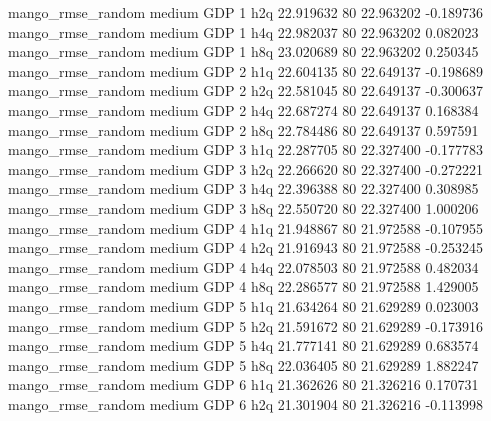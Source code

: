 mango_rmse_random     medium      GDP                 1                  h2q 22.919632 80      22.963202          -0.189736
mango_rmse_random     medium      GDP                 1                  h4q 22.982037 80      22.963202           0.082023
mango_rmse_random     medium      GDP                 1                  h8q 23.020689 80      22.963202           0.250345
mango_rmse_random     medium      GDP                 2                  h1q 22.604135 80      22.649137          -0.198689
mango_rmse_random     medium      GDP                 2                  h2q 22.581045 80      22.649137          -0.300637
mango_rmse_random     medium      GDP                 2                  h4q 22.687274 80      22.649137           0.168384
mango_rmse_random     medium      GDP                 2                  h8q 22.784486 80      22.649137           0.597591
mango_rmse_random     medium      GDP                 3                  h1q 22.287705 80      22.327400          -0.177783
mango_rmse_random     medium      GDP                 3                  h2q 22.266620 80      22.327400          -0.272221
mango_rmse_random     medium      GDP                 3                  h4q 22.396388 80      22.327400           0.308985
mango_rmse_random     medium      GDP                 3                  h8q 22.550720 80      22.327400           1.000206
mango_rmse_random     medium      GDP                 4                  h1q 21.948867 80      21.972588          -0.107955
mango_rmse_random     medium      GDP                 4                  h2q 21.916943 80      21.972588          -0.253245
mango_rmse_random     medium      GDP                 4                  h4q 22.078503 80      21.972588           0.482034
mango_rmse_random     medium      GDP                 4                  h8q 22.286577 80      21.972588           1.429005
mango_rmse_random     medium      GDP                 5                  h1q 21.634264 80      21.629289           0.023003
mango_rmse_random     medium      GDP                 5                  h2q 21.591672 80      21.629289          -0.173916
mango_rmse_random     medium      GDP                 5                  h4q 21.777141 80      21.629289           0.683574
mango_rmse_random     medium      GDP                 5                  h8q 22.036405 80      21.629289           1.882247
mango_rmse_random     medium      GDP                 6                  h1q 21.362626 80      21.326216           0.170731
mango_rmse_random     medium      GDP                 6                  h2q 21.301904 80      21.326216          -0.113998
